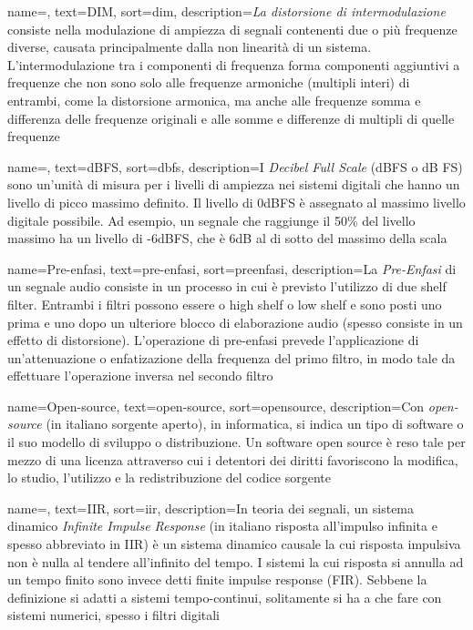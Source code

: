 {
    name=,
    text=DIM,
    sort=dim,
    description={\emph{La distorsione di intermodulazione} consiste nella modulazione di ampiezza di segnali contenenti due o più frequenze diverse, causata principalmente dalla non linearità di un sistema. L'intermodulazione tra i componenti di frequenza forma componenti aggiuntivi a frequenze che non sono solo alle frequenze armoniche (multipli interi) di entrambi, come la distorsione armonica, ma anche alle frequenze somma e differenza delle frequenze originali e alle somme e differenze di multipli di quelle frequenze}
}

{
    name=,
    text=dBFS,
    sort=dbfs,
    description={I \emph{Decibel Full Scale} (dBFS o dB FS) sono un'unità di misura per i livelli di ampiezza nei sistemi digitali che hanno un livello di picco massimo definito. Il livello di 0dBFS è assegnato al massimo livello digitale possibile. Ad esempio, un segnale che raggiunge il 50\% del livello massimo ha un livello di -6dBFS, che è 6dB al di sotto del massimo della scala}
}

{
    name=Pre-enfasi,
    text=pre-enfasi,
    sort=preenfasi,
    description={La \textit{Pre-Enfasi} di un segnale audio consiste in un processo in cui è previsto l'utilizzo di due shelf filter. Entrambi i filtri possono essere o high shelf o low shelf e sono posti uno prima e uno dopo un ulteriore blocco di elaborazione audio (spesso consiste in un effetto di distorsione). L'operazione di pre-enfasi prevede l'applicazione di un'attenuazione o enfatizazione della frequenza del primo filtro, in modo tale da effettuare l'operazione inversa nel secondo filtro}
}

{
    name=Open-source,
    text=open-source,
    sort=opensource,
    description={Con \textit{open-source} (in italiano sorgente aperto), in informatica, si indica un tipo di software o il suo modello di sviluppo o distribuzione. Un software open source è reso tale per mezzo di una licenza attraverso cui i detentori dei diritti favoriscono la modifica, lo studio, l’utilizzo e la redistribuzione del codice sorgente}
}

{
    name=,
    text=IIR,
    sort=iir,
    description={In teoria dei segnali, un sistema dinamico \textit{Infinite Impulse Response} (in italiano risposta all'impulso infinita e spesso abbreviato in IIR) è un sistema dinamico causale la cui risposta impulsiva non è nulla al tendere all'infinito del tempo. I sistemi la cui risposta si annulla ad un tempo finito sono invece detti finite impulse response (FIR). Sebbene la definizione si adatti a sistemi tempo-continui, solitamente si ha a che fare con sistemi numerici, spesso i filtri digitali}
}


